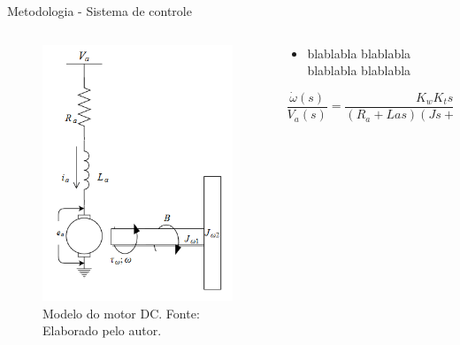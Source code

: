 \documentclass{beamer}
\begin{document}
\begin{frame}{Metodologia - Sistema de controle}

\begin{columns}
    \begin{column}{0.40\textwidth}
        \begin{figure}[HT]
		\begin{center}
		\captionsetup{justification=centering}
        \includegraphics[scale=.4]{../metodologia/img/modelo_motor_dc}
        \caption{Modelo do motor DC. \newline
        		 Fonte: Elaborado pelo autor.}
		\label{FIG_ADAPTATIVO}
        \end{center}
	\end{figure}
    \end{column}
    \begin{column}{0.60\textwidth}
    \begin{itemize}
    	\justifying
    	\item blablabla blablabla blablabla blablabla
    \end{itemize}


	\begin{equation}\label{eq:motor_accel}
	  	\frac{\dot{\omega}(s)}{V_a(s)} = \frac{K_wK_t s}{(R_a+ Las)(Js+B)+K_wK_t}  
	\end{equation}
    \end{column}
\end{columns}
\end{frame}
\end{document}
